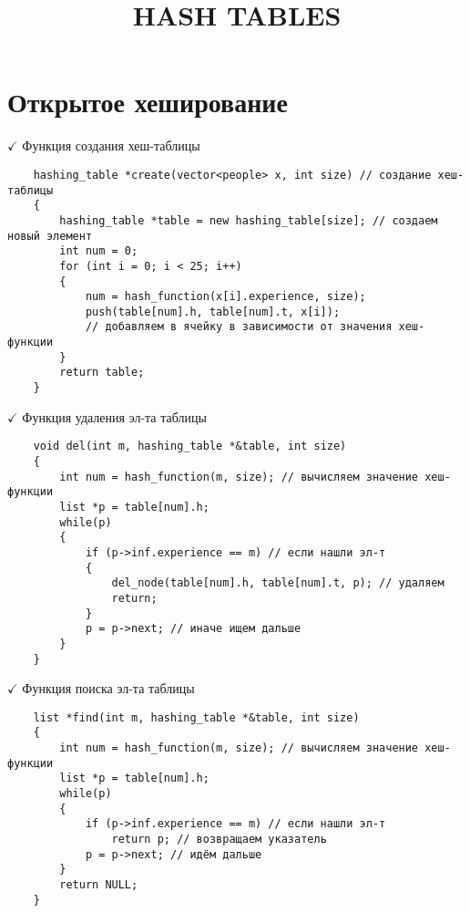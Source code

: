 \documentclass[a4paper, 14pt]{extarticle}
\author{}
\title{\MakeUppercase{Hash tables}}
\date{}
\begin{document}
\maketitle
\thispagestyle{empty}
\pagestyle{empty}
\section*{Открытое хеширование}
$\checkmark$ Функция создания хеш-таблицы
\begin{verbatim}
    hashing_table *create(vector<people> x, int size) // создание хеш-таблицы
    {
        hashing_table *table = new hashing_table[size]; // создаем новый элемент
        int num = 0;
        for (int i = 0; i < 25; i++)
        {
            num = hash_function(x[i].experience, size); 
            push(table[num].h, table[num].t, x[i]); 
            // добавляем в ячейку в зависимости от значения хеш-функции
        }
        return table;
    }
\end{verbatim}
$\checkmark$ Функция удаления эл-та таблицы
\begin{verbatim}
    void del(int m, hashing_table *&table, int size) 
    { 
        int num = hash_function(m, size); // вычисляем значение хеш-функции
        list *p = table[num].h;
        while(p)
        {
            if (p->inf.experience == m) // если нашли эл-т 
            {
                del_node(table[num].h, table[num].t, p); // удаляем
                return;
            }
            p = p->next; // иначе ищем дальше
        }
    }
\end{verbatim}
$\checkmark$ Функция поиска эл-та таблицы
\begin{verbatim}
    list *find(int m, hashing_table *&table, int size)
    {
        int num = hash_function(m, size); // вычисляем значение хеш-функции
        list *p = table[num].h;
        while(p)
        {
            if (p->inf.experience == m) // если нашли эл-т 
                return p; // возвращаем указатель
            p = p->next; // идём дальше
        }
        return NULL;
    }
\end{verbatim}
\end{document}
